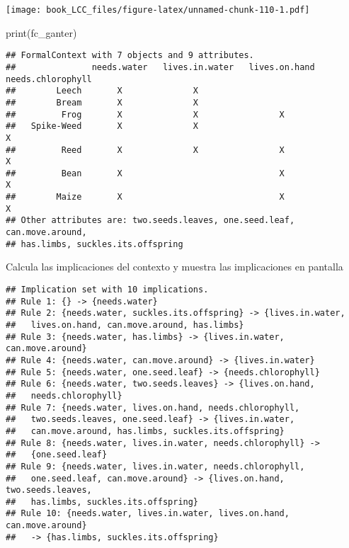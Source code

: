\documentclass[
]{book}
\newenvironment{Shaded}{\begin{snugshade}}{\end{snugshade}}
\newcommand{\FunctionTok}[1]{\textcolor[rgb]{0.00,0.00,0.00}{#1}}
\newcommand{\NormalTok}[1]{#1}
\newcommand{\SpecialCharTok}[1]{\textcolor[rgb]{0.00,0.00,0.00}{#1}}
\begin{document}
\texttt{[image: book\_LCC\_files/figure-latex/unnamed-chunk-110-1.pdf]}

\begin{Shaded}
\begin{Highlighting}[]
\FunctionTok{print}\NormalTok{(fc\_ganter)}
\end{Highlighting}
\end{Shaded}

\begin{verbatim}
## FormalContext with 7 objects and 9 attributes.
##               needs.water   lives.in.water   lives.on.hand   needs.chlorophyll  
##        Leech       X              X                                             
##        Bream       X              X                                             
##         Frog       X              X                X                            
##   Spike-Weed       X              X                                  X          
##         Reed       X              X                X                 X          
##         Bean       X                               X                 X          
##        Maize       X                               X                 X          
## Other attributes are: two.seeds.leaves, one.seed.leaf, can.move.around,
## has.limbs, suckles.its.offspring
\end{verbatim}

Calcula las implicaciones del contexto y muestra las implicaciones en pantalla

\begin{Shaded}
\end{Shaded}

\begin{verbatim}
## Implication set with 10 implications.
## Rule 1: {} -> {needs.water}
## Rule 2: {needs.water, suckles.its.offspring} -> {lives.in.water,
##   lives.on.hand, can.move.around, has.limbs}
## Rule 3: {needs.water, has.limbs} -> {lives.in.water, can.move.around}
## Rule 4: {needs.water, can.move.around} -> {lives.in.water}
## Rule 5: {needs.water, one.seed.leaf} -> {needs.chlorophyll}
## Rule 6: {needs.water, two.seeds.leaves} -> {lives.on.hand,
##   needs.chlorophyll}
## Rule 7: {needs.water, lives.on.hand, needs.chlorophyll,
##   two.seeds.leaves, one.seed.leaf} -> {lives.in.water,
##   can.move.around, has.limbs, suckles.its.offspring}
## Rule 8: {needs.water, lives.in.water, needs.chlorophyll} ->
##   {one.seed.leaf}
## Rule 9: {needs.water, lives.in.water, needs.chlorophyll,
##   one.seed.leaf, can.move.around} -> {lives.on.hand, two.seeds.leaves,
##   has.limbs, suckles.its.offspring}
## Rule 10: {needs.water, lives.in.water, lives.on.hand, can.move.around}
##   -> {has.limbs, suckles.its.offspring}
\end{verbatim}
\end{document}
